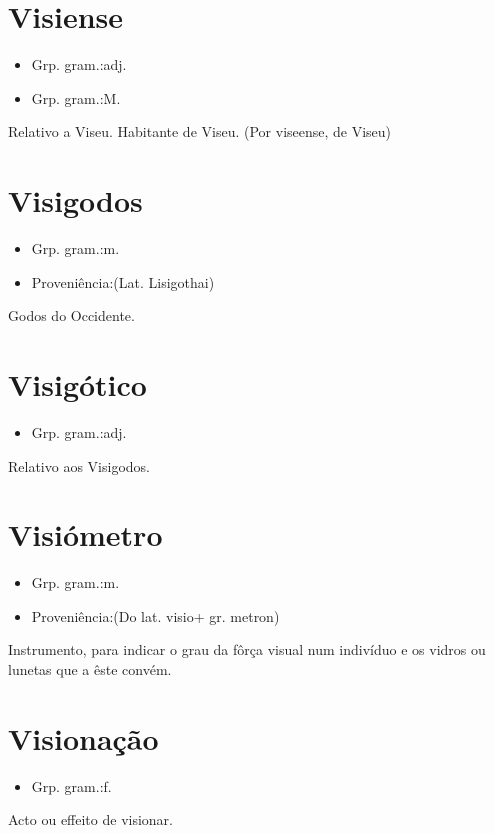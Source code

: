 \documentclass{article}
\begin{document}
\section{Visiense}
\begin{itemize}
\item {Grp. gram.:adj.}
\end{itemize}
\begin{itemize}
\item {Grp. gram.:M.}
\end{itemize}
Relativo a Viseu.
Habitante de Viseu.
(Por \textunderscore viseense\textunderscore , de \textunderscore Viseu\textunderscore )
\section{Visigodos}
\begin{itemize}
\item {Grp. gram.:m.}
\end{itemize}
\begin{itemize}
\item {Proveniência:(Lat. \textunderscore Lisigothai\textunderscore )}
\end{itemize}
Godos do Occidente.
\section{Visigótico}
\begin{itemize}
\item {Grp. gram.:adj.}
\end{itemize}
Relativo aos Visigodos.
\section{Visiómetro}
\begin{itemize}
\item {Grp. gram.:m.}
\end{itemize}
\begin{itemize}
\item {Proveniência:(Do lat. \textunderscore visio\textunderscore  + gr. \textunderscore metron\textunderscore )}
\end{itemize}
Instrumento, para indicar o grau da fôrça visual num indivíduo e os vidros ou lunetas que a êste convém.
\section{Visionação}
\begin{itemize}
\item {Grp. gram.:f.}
\end{itemize}
Acto ou effeito de visionar.
\end{document}
